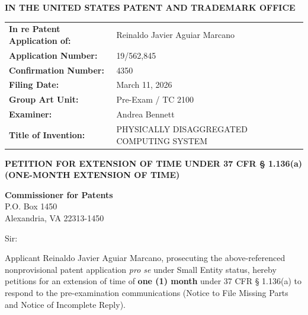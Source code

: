 \documentclass[11pt,letterpaper]{article}
\begin{document}
\thispagestyle{empty}

\begin{center}
    \large\textbf{IN THE UNITED STATES PATENT AND TRADEMARK OFFICE} \\
\end{center}

\vspace{0.3cm}
\noindent\begin{tabular}{p{2.3in}p{4.0in}}
\textbf{In re Patent Application of:} & Reinaldo Javier Aguiar Marcano \\
\textbf{Application Number:} & 19/562,845 \\
\textbf{Confirmation Number:} & 4350 \\
\textbf{Filing Date:} & March 11, 2026 \\
\textbf{Group Art Unit:} & Pre-Exam / TC 2100 \\
\textbf{Examiner:} & Andrea Bennett \\
\textbf{Title of Invention:} & PHYSICALLY DISAGGREGATED COMPUTING SYSTEM \\
\end{tabular}

\vspace{0.8cm}
\begin{center}
    \textbf{\large PETITION FOR EXTENSION OF TIME UNDER 37 CFR \S{} 1.136(a) \\
    (ONE-MONTH EXTENSION OF TIME)}
\end{center}

\vspace{0.4cm}
\noindent\textbf{Commissioner for Patents} \\
\noindent P.O. Box 1450 \\
\noindent Alexandria, VA 22313-1450

\vspace{0.4cm}
\noindent Sir:

Applicant Reinaldo Javier Aguiar Marcano, prosecuting the above-referenced nonprovisional patent application \textit{pro se} under Small Entity status, hereby petitions for an extension of time of \textbf{one (1) month} under 37 CFR \S{} 1.136(a) to respond to the pre-examination communications (Notice to File Missing Parts and Notice of Incomplete Reply).
\end{document}
